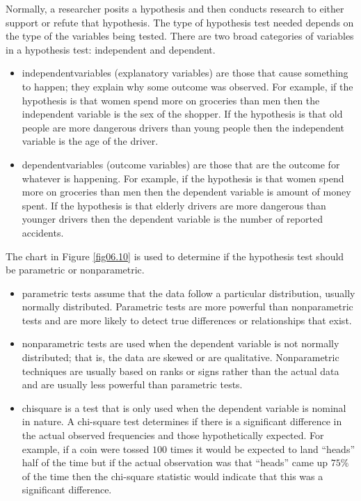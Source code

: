 Normally, a researcher posits a hypothesis and then conducts research to either support or refute that hypothesis. The type of hypothesis test needed depends on the type of the variables being tested. There are two broad categories of variables in a hypothesis test: independent and dependent.

\begin{itemize}
	\item \Glspl{independentvariable} (explanatory variables) are those that cause something to happen; they explain why some outcome was observed. For example, if the hypothesis is that women spend more on groceries than men then the independent variable is the sex of the shopper. If the hypothesis is that old people are more dangerous drivers than young people then the independent variable is the age of the driver.
	\item \Glspl{dependentvariable} (outcome variables) are those that are the outcome for whatever is happening. For example, if the hypothesis is that women spend more on groceries than men then the dependent variable is amount of money spent. If the hypothesis is that elderly drivers are more dangerous than younger drivers then the dependent variable is the number of reported accidents.
\end{itemize}

The chart in Figure \ref{fig06.10} is used to determine if the hypothesis test should be parametric or nonparametric.

\begin{itemize}
	\item \Gls{parametric} tests assume that the data follow a particular distribution, usually normally distributed. Parametric tests are more powerful than nonparametric tests and are more likely to detect true differences or relationships that exist.
	\item \Gls{nonparametric} tests are used when the dependent variable is not normally distributed; that is, the data are skewed or are qualitative. Nonparametric techniques are usually based on ranks or signs rather than the actual data and are usually less powerful than parametric tests.
	\item \Gls{chisquare} is a test that is only used when the dependent variable is nominal in nature. A chi-square test determines if there is a significant difference in the actual observed frequencies and those hypothetically expected. For example, if a coin were tossed $ 100 $ times it would be expected to land ``heads'' half of the time but if the actual observation was that ``heads'' came up $ 75\% $ of the time then the chi-square statistic would indicate that this was a significant difference.
\end{itemize}

